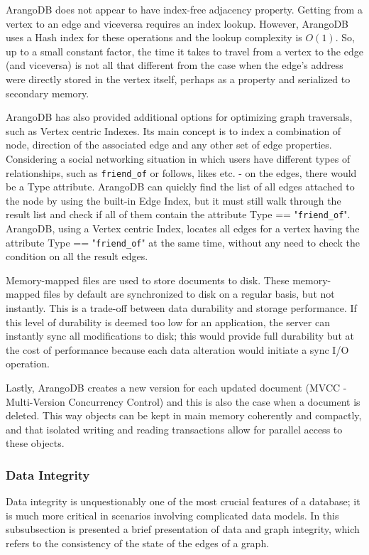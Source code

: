 ArangoDB does not appear to have index-free adjacency property.
Getting from a vertex to an edge and viceversa requires an index lookup.
However, ArangoDB uses a Hash index for these operations and the lookup complexity is $ O \left( 1 \right) $.
So, up to a small constant factor, the time it takes to travel from a vertex to the edge (and viceversa) is not all that different from the case when the edge's address were directly stored in the vertex itself, perhaps as a property and serialized to secondary memory.

ArangoDB has also provided additional options for optimizing graph traversals, such as Vertex centric Indexes.
Its main concept is to index a combination of node, direction of the associated edge and any other set of edge properties.
Considering a social networking situation in which users have different types of relationships, such as \texttt{friend\_of} or follows, likes etc. - on the edges, there would be a Type attribute.
ArangoDB can quickly find the list of all edges attached to the node by using the built-in Edge Index, but it must still walk through the result list and check if all of them contain the attribute Type == "\texttt{friend\_of}".
ArangoDB, using a Vertex centric Index, locates all edges for a vertex having the attribute Type == "\texttt{friend\_of}" at the same time, without any need to check the condition on all the result edges.

Memory-mapped files are used to store documents to disk.
These memory-mapped files by default are synchronized to disk on a regular basis, but not instantly.
This is a trade-off between data durability and storage performance.
If this level of durability is deemed too low for an application, the server can instantly sync all modifications to disk;
this would provide full durability but at the cost of performance because each data alteration would initiate a sync I/O operation.

Lastly, ArangoDB creates a new version for each updated document (MVCC - Multi-Version Concurrency Control) and this is also the case when a document is deleted.
This way objects can be kept in main memory coherently and compactly, and that isolated writing and reading transactions allow for parallel access to these objects.

\subsubsection{Data Integrity}\label{subsubsection:LiteratureReview/ReviewofGraphDatabaseSystems/AGDBMSindetailArangoDB/DataIntegrity}
Data integrity is unquestionably one of the most crucial features of a database;
it is much more critical in scenarios involving complicated data models.
In this subsubsection is presented a brief presentation of data and graph integrity, which refers to the consistency of the state of the edges of a graph.

